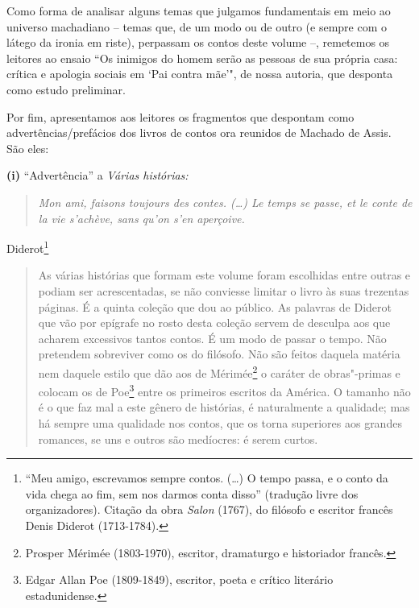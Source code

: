 Como forma de analisar alguns temas que julgamos fundamentais em meio ao
universo machadiano -- temas que, de um modo ou de outro (e sempre com o
látego da ironia em riste), perpassam os contos deste volume --,
remetemos os leitores ao ensaio ``Os inimigos do homem serão as pessoas
de sua própria casa: crítica e apologia sociais em `Pai contra mãe'",
de nossa autoria, que desponta como estudo preliminar.

Por fim, apresentamos aos leitores os fragmentos que despontam como
advertências/prefácios dos livros de contos ora reunidos de Machado de
Assis. São eles:

\pagebreak

\textbf{(i)} ``Advertência'' a \emph{Várias histórias: }
\begin{quote}
\emph{Mon ami, faisons toujours des contes. (\ldots{}) Le temps se passe, et
le conte de la vie s'achève, sans qu'on s'en aperçoive. }
\end{quote}

\begin{flushright}
Diderot\footnote{``Meu amigo, escrevamos sempre contos. (\ldots{}) O tempo
  passa, e o conto da vida chega ao fim, sem nos darmos conta disso''
  (tradução livre dos organizadores). Citação da obra \emph{Salon}
  (1767), do filósofo e escritor francês Denis Diderot (1713-1784).}
 \end{flushright}

\begin{quote}
As várias histórias que formam este volume foram escolhidas entre outras
e podiam ser acrescentadas, se não conviesse limitar o livro às suas
trezentas páginas. É a quinta coleção que dou ao público. As palavras de
Diderot que vão por epígrafe no rosto desta coleção servem de desculpa
aos que acharem excessivos tantos contos. É um modo de passar o tempo.
Não pretendem sobreviver como os do filósofo. Não são feitos daquela
matéria nem daquele estilo que dão aos de Mérimée\footnote{Prosper
  Mérimée (1803-1970), escritor, dramaturgo e historiador francês.} o
caráter de obras"-primas e colocam os de Poe\footnote{Edgar Allan Poe
  (1809-1849), escritor, poeta e crítico literário estadunidense.} entre
os primeiros escritos da América. O tamanho não é o que faz mal a este
gênero de histórias, é naturalmente a qualidade; mas há sempre uma
qualidade nos contos, que os torna superiores aos grandes romances, se
uns e outros são medíocres: é serem curtos.
\end{quote}

\bigskip

